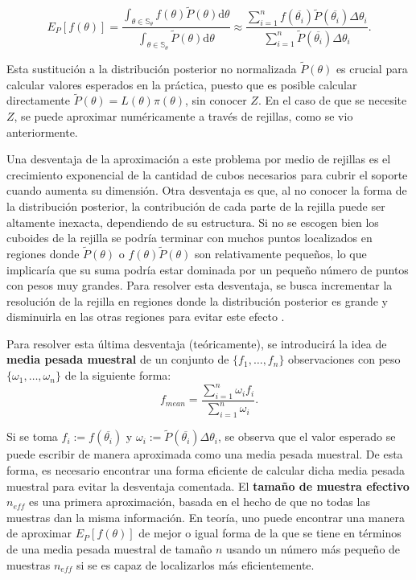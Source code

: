		$$E_P[f(\theta)]=\frac{\int_{\theta\in\mathbb{S}_\theta} f(\theta)\tilde{P}(\theta)\mathrm{d}\theta}{\int_{\theta\in\mathbb{S}_\theta} \tilde{P}(\theta)\mathrm{d}\theta}\approx \frac{\sum_{i=1}^nf(\overline{\theta_i})\tilde{P}(\overline{\theta_i})\Delta \theta_i}{\sum_{i=1}^n \tilde{P}(\overline{\theta_i})\Delta \theta_i}.$$
		
		Esta sustitución a la distribución posterior no normalizada $\tilde{P}(\theta)$ es crucial para calcular valores esperados en la práctica, puesto que es posible calcular directamente $\tilde{P}(\theta)=L(\theta)\pi(\theta)$, sin conocer $Z$. En el caso de que se necesite $Z$, se puede aproximar numéricamente a través de rejillas, como se vio anteriormente.
		
		Una desventaja de la aproximación a este problema por medio de rejillas es el crecimiento exponencial de la cantidad de cubos necesarios para cubrir el soporte cuando aumenta su dimensión. Otra desventaja es que, al no conocer la forma de la distribución posterior, la contribución de cada parte de la rejilla puede ser altamente inexacta, dependiendo de su estructura. Si no se escogen bien los cuboides de la rejilla se podría terminar con muchos puntos localizados en regiones donde $\tilde{P}(\theta)$ o $f(\theta)\tilde{P}(\theta)$ son relativamente pequeños, lo que implicaría que su suma podría estar dominada por un pequeño número de puntos con pesos muy grandes. Para resolver esta desventaja, se busca incrementar la resolución de la rejilla en regiones donde la distribución posterior es grande y disminuirla en las otras regiones para evitar este efecto \cite{speagle2019conceptual}.
		
		Para resolver esta última desventaja (teóricamente), se introducirá la idea de \textbf{media pesada muestral} de un conjunto de $\{f_1,\dots,f_n\}$ observaciones con peso $\{\omega_1,\dots,\omega_n\}$ de la siguiente forma:
		\begin{equation}
			f_{mean}=\frac{\sum_{i=1}^n \omega_i f_i}{\sum_{i=1}^n\omega_i}.
\end{equation}			

	Si se toma $f_i:=f(\overline{\theta_i})$ y $\omega_i:=\tilde{P}(\overline{\theta_i})\Delta \theta_i$, se observa que el valor esperado se puede escribir de manera aproximada como una media pesada muestral. De esta forma, es necesario encontrar una forma eficiente de calcular dicha media pesada muestral para evitar la desventaja comentada. El \textbf{tamaño de muestra efectivo} $n_{eff}$ es una primera aproximación, basada en el hecho de que no todas las muestras dan la misma información. En teoría, uno puede encontrar una manera de aproximar $E_P[f(\theta)]$ de mejor o igual forma de la que se tiene en términos de una media pesada muestral de tamaño $n$ usando un número más pequeño de muestras $n_{eff}$ si se es capaz de localizarlos más eficientemente.
	
